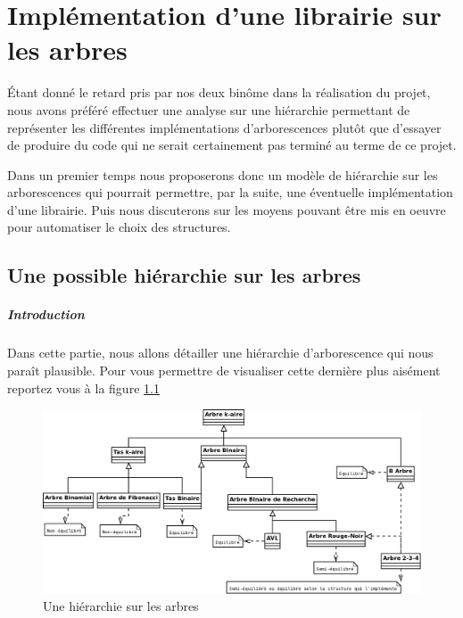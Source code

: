 \chapter[Librairie d'arbres]{Implémentation d'une librairie sur les arbres%
}
Étant donné le retard pris par nos deux binôme dans la réalisation du projet, nous avons préféré effectuer une analyse sur une hiérarchie permettant de représenter les différentes implémentations d'arborescences plutôt que d'essayer de produire du code qui ne serait certainement pas terminé au terme de ce projet.

Dans un premier temps nous proposerons donc un modèle de hiérarchie sur les arborescences qui pourrait permettre, par la suite, une éventuelle implémentation d'une librairie. Puis nous discuterons sur les moyens pouvant être mis en oeuvre pour automatiser le choix des structures.

\section{Une possible hiérarchie sur les arbres%
}
\paragraph{Introduction} Dans cette partie, nous allons détailler une hiérarchie d'arborescence qui nous paraît plausible. Pour vous permettre de visualiser cette dernière plus aisément reportez vous à la figure \ref{fig:hierarchie} 
\begin{landscape}
\begin{figure}[h]
	\centering
	\includegraphics[scale=0.5]{Hierarchie_arbres}
	\caption{Une hiérarchie sur les arbres}
	\label{fig:hierarchie}
\end{figure}
\end{landscape}

